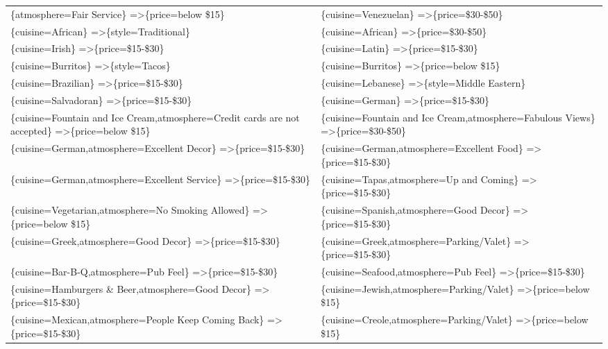 \documentclass[letterpaper,10pt]{article}
\begin{document}
\begin{appendices}
\begin{table}[h]
\begin{adjustbox}{max width=\textwidth}
\begin{tabular}{ll}
\{atmosphere=Fair Service\} =\textgreater \{price=below \$15\} & \{cuisine=Venezuelan\} =\textgreater \{price=\$30-\$50\} \\
\{cuisine=African\} =\textgreater \{style=Traditional\} & \{cuisine=African\} =\textgreater \{price=\$30-\$50\} \\
\{cuisine=Irish\} =\textgreater \{price=\$15-\$30\} & \{cuisine=Latin\} =\textgreater \{price=\$15-\$30\} \\
\{cuisine=Burritos\} =\textgreater \{style=Tacos\} & \{cuisine=Burritos\} =\textgreater \{price=below \$15\} \\
\{cuisine=Brazilian\} =\textgreater \{price=\$15-\$30\} & \{cuisine=Lebanese\} =\textgreater \{style=Middle Eastern\} \\
\{cuisine=Salvadoran\} =\textgreater \{price=\$15-\$30\} & \{cuisine=German\} =\textgreater \{price=\$15-\$30\} \\
\{cuisine=Fountain and Ice Cream,atmosphere=Credit cards are not accepted\} =\textgreater \{price=below \$15\} & \{cuisine=Fountain and Ice Cream,atmosphere=Fabulous Views\} =\textgreater \{price=\$30-\$50\} \\
\{cuisine=German,atmosphere=Excellent Decor\} =\textgreater \{price=\$15-\$30\} & \{cuisine=German,atmosphere=Excellent Food\} =\textgreater \{price=\$15-\$30\} \\
\{cuisine=German,atmosphere=Excellent Service\} =\textgreater \{price=\$15-\$30\} & \{cuisine=Tapas,atmosphere=Up and Coming\} =\textgreater \{price=\$15-\$30\} \\
\{cuisine=Vegetarian,atmosphere=No Smoking Allowed\} =\textgreater \{price=below \$15\} & \{cuisine=Spanish,atmosphere=Good Decor\} =\textgreater \{price=\$15-\$30\} \\
\{cuisine=Greek,atmosphere=Good Decor\} =\textgreater \{price=\$15-\$30\} & \{cuisine=Greek,atmosphere=Parking/Valet\} =\textgreater \{price=\$15-\$30\} \\
\{cuisine=Bar-B-Q,atmosphere=Pub Feel\} =\textgreater \{price=\$15-\$30\} & \{cuisine=Seafood,atmosphere=Pub Feel\} =\textgreater \{price=\$15-\$30\} \\
\{cuisine=Hamburgers \& Beer,atmosphere=Good Decor\} =\textgreater \{price=\$15-\$30\} & \{cuisine=Jewish,atmosphere=Parking/Valet\} =\textgreater \{price=below \$15\} \\
\{cuisine=Mexican,atmosphere=People Keep Coming Back\} =\textgreater \{price=\$15-\$30\} & \{cuisine=Creole,atmosphere=Parking/Valet\} =\textgreater \{price=below \$15\} \\

\end{tabular}
\end{adjustbox}
\end{table}
\end{appendices}
\end{document}
